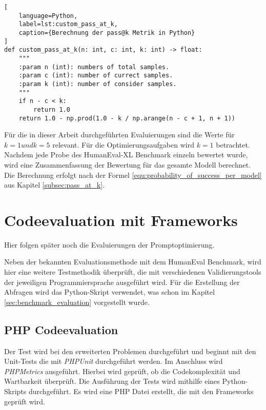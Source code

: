\begin{lstlisting}[
	language=Python,
	label=lst:custom_pass_at_k,
	caption={Berechnung der pass@k Metrik in Python}
]
def custom_pass_at_k(n: int, c: int, k: int) -> float:
    """
    :param n (int): numbers of total samples.
    :param c (int): number of currect samples.
    :param k (int): number of consider samples.
    """
    if n - c < k:
        return 1.0
    return 1.0 - np.prod(1.0 - k / np.arange(n - c + 1, n + 1))
\end{lstlisting}

Für die in dieser Arbeit durchgeführten Evaluierungen sind die Werte für $k=1 und k=5$ relevant. Für die Optimierungsaufgaben wird $k=1$ betrachtet. Nachdem jede Probe des HumanEval-XL Benchmark einzeln bewertet wurde, wird eine Zusammenfassung der Bewertung für das gesamte Modell berechnet. Die Berechnung erfolgt nach der Formel \ref{equ:probability_of_success_per_model} aus Kapitel \ref{subsec:pass_at_k}.



\section{Codeevaluation mit Frameworks}
\begin{tcolorbox}[
	enhanced,
	colback=red!5!white,
	colframe=red!75!black!50,
	title= Mein roter Faden
	]
	Hier folgen später noch die Evaluierungen der Promptoptimierung.
\end{tcolorbox}

Neben der bekannten Evaluationsmethode mit dem HumanEval Benchmark, wird hier eine weitere Testmethodik überprüft, die mit verschiedenen Validierungstools der jeweiligen Programmiersprache ausgeführt wird. Für die Erstellung der Abfragen wird das Python-Skript verwendet, was schon im Kapitel \ref{sec:benchmark_evaluation} vorgestellt wurde.

\subsection{PHP Codeevaluation}
Der Test wird bei den erweiterten Problemen durchgeführt und beginnt mit den Unit-Tests die mit \textit{PHPUnit} durchgeführt werden. Im Anschluss wird \textit{PHPMetrics} ausgeführt. Hierbei wird geprüft, ob die Codekomplexität und Wartbarkeit überprüft. Die Ausführung der Tests wird mithilfe eines Python-Skripts durchgeführt. Es wird eine PHP Datei erstellt, die mit den Frameworks geprüft wird.

